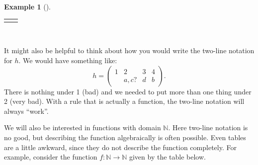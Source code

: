 \documentclass[10pt,]{book}
\theoremstyle{plain}
\theoremstyle{definition}
\theoremstyle{definition}
\newtheorem{example}[theorem]{Example}
\theoremstyle{definition}
\numberwithin{equation}{chapter}
\newlength{\panelmax}
\def\N{\mathbb N}
\newcommand{\twoline}[2]{\begin{pmatrix}#1 \\ #2 \end{pmatrix}}
\newcommand{\amp}{&}
\begin{document}
\begin{example}[]
{\setlength{\phBimage}{\ht\panelboxBimage+\dp\panelboxBimage}
\settototalheight{\phBimage}{\usebox{\panelboxBimage}}
\setlength{\panelmax}{\maxof{\panelmax}{\phBimage}}
\leavevmode%
\setlength{\tabcolsep}{0.1375\linewidth}
\par\medskip\noindent
\hspace*{0.1375\linewidth}%
\begin{tabular}{@{}*{2}{c}@{}}
\begin{minipage}[c][\panelmax][t]{0.18\linewidth}\usebox{\panelboxAimage}\end{minipage}&
\begin{minipage}[c][\panelmax][t]{0.27\linewidth}\usebox{\panelboxBimage}\end{minipage}\end{tabular}\\
}%
\par
\hypertarget{p-2103}{}%
It might also be helpful to think about how you would write the two-line notation for \(h\). We would have something like:%
\begin{equation*}
h=\twoline{1 \amp 2 \amp 3 \amp 4}{\amp a,c? \amp d \amp b}.
\end{equation*}
There is nothing under 1 (bad) and we needed to put more than one thing under 2 (very bad). With a rule that is actually a function, the two-line notation will always ``work''.%
\end{example}
\hypertarget{p-2104}{}%
We will also be interested in functions with domain \(\N\).  Here two-line notation is no good, but describing the function algebraically is often possible.  Even tables are a little awkward, since they do not describe the function completely.  For example, consider the function \(f:\N \to \N\) given by the table below.%
\end{document}
